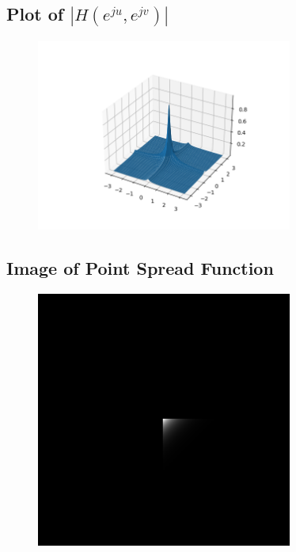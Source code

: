 \documentclass{article}
\begin{document}
\subsection{Plot of $|H(e^{ju}, e^{jv})|$}
\begin{figure}[H]
    \centering
    \includegraphics[width=0.75\textwidth]{../results/section5-python.png}
    \begin{center}
    \end{center}
    \label{fig:A1}
\end{figure}
\subsection{Image of Point Spread Function}
\begin{figure}[H]
    \centering
    \includegraphics[width=0.75\textwidth]{../results/h_out.png}
    \begin{center}
    \end{center}
    \label{fig:A1}
\end{figure}
\end{document}
